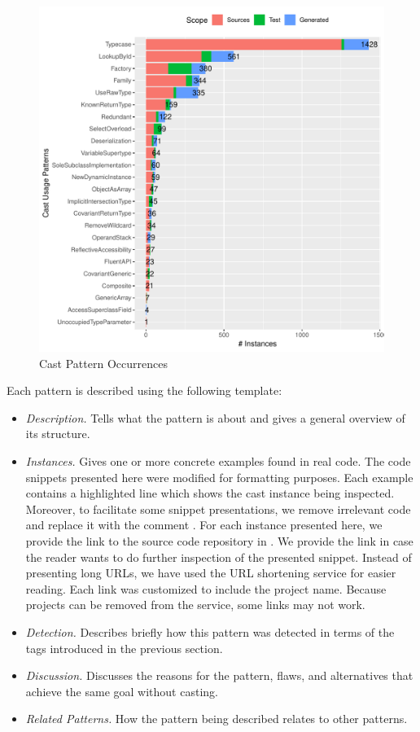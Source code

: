 \begin{figure}[ht!]
\centering
\includegraphics[width=\textwidth]{analysis/table-patterns.pdf}
\caption{Cast Pattern Occurrences} \label{fig:patterns}
\end{figure}

Each pattern is described using the following template:

\begin{itemize}
\item \textit{Description.}
Tells what the pattern is about and gives a general overview of its structure.
\item \textit{Instances.}
Gives one or more concrete examples found in real code.
The code snippets presented here were modified for formatting purposes.
Each example contains a highlighted line which shows the cast instance being inspected.
Moreover, to facilitate some snippet presentations,
we remove irrelevant code and replace it with the
comment \code{/* [...] */}.
For each instance presented here, we provide the link to the source code repository in \lgtm{}.
We provide the link in case the reader wants to do further inspection of the presented snippet.
Instead of presenting long \lgtm{} URLs, we have used the URL shortening service
\href{https://bitly.com/}{\bitly} for easier reading.
Each \bitly{} link was customized to include the project name.
Because projects can be removed from the \lgtm{} service,
some links may not work.
\item \textit{Detection.}
Describes briefly how this pattern was detected in terms of the tags introduced in the previous section.
\item \textit{Discussion.}
Discusses the reasons for the pattern, flaws, and alternatives that achieve the same goal without casting.
\item \textit{Related Patterns.}
How the pattern being described relates to other patterns.
\end{itemize}

